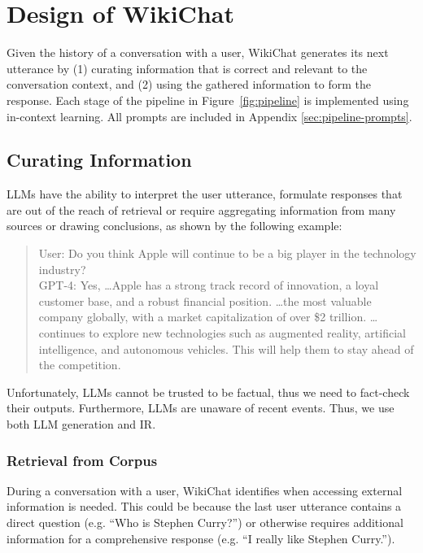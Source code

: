 \documentclass[11pt]{article}
\newcommand{\system}[0]{WikiChat\xspace}
\begin{document}


\section{Design of \system}

Given the history of a conversation with a user, 
\system generates its next utterance by 
(1) curating information that is correct and relevant to the conversation context, and
(2) using the gathered information to form the response. 
Each stage of the pipeline in Figure~\ref{fig:pipeline}
is implemented using in-context learning. All prompts are included in Appendix \ref{sec:pipeline-prompts}. 

\subsection{Curating Information}
LLMs have the ability to interpret the user utterance, formulate responses that are out of the reach of retrieval or require aggregating information from many sources or drawing conclusions, as shown by 
the following example:
\begin{quote}\small

User: Do you think Apple will continue to be a big player in the technology industry? \\
GPT-4: Yes, \ldots Apple has a strong track record of innovation, a loyal customer base, and a robust financial position. \ldots the most valuable company globally, with a market capitalization of over \$2 trillion. \ldots continues to explore new technologies such as augmented reality, artificial intelligence, and autonomous vehicles. This will help them to stay ahead of the competition.
\end{quote}

Unfortunately, LLMs cannot be trusted to be factual, thus we need to fact-check their outputs. Furthermore, LLMs are unaware of recent events.
Thus, we use both LLM generation and IR.

\subsubsection{Retrieval from Corpus}
\label{sec:IR}
During a conversation with a user, \system identifies when accessing external information is needed. This could be because the last user utterance contains a direct question (e.g. ``Who is Stephen Curry?'') or otherwise requires additional information for a comprehensive response (e.g. ``I really like Stephen Curry.''). 
\end{document}
